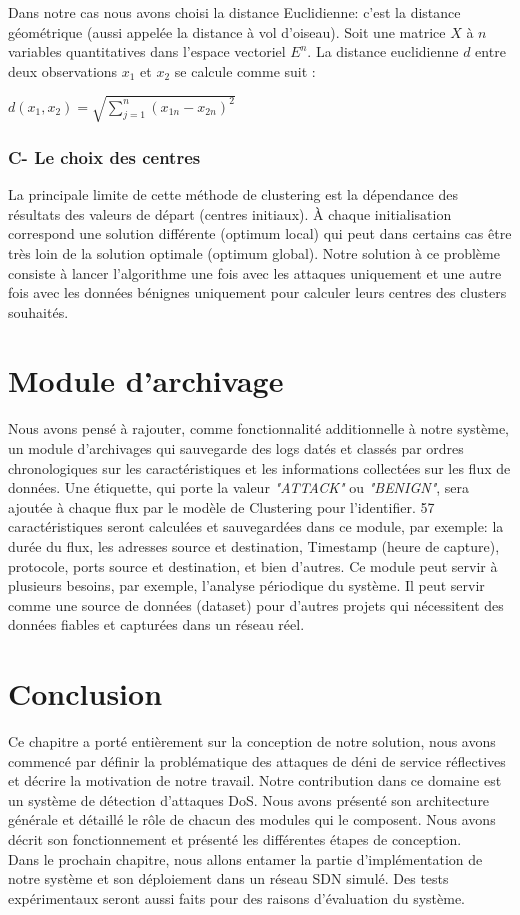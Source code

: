 \noindent Dans notre cas nous avons choisi la distance Euclidienne: c’est la distance géométrique (aussi appelée la distance à vol d’oiseau). Soit une matrice $X$ à $n$ variables quantitatives dans l’espace vectoriel $E^{n}$. La distance euclidienne $d$ entre deux observations $x_{1}$ et $x_{2}$ se calcule comme suit :

\begin{large}
		\begin{center}
			$ d(x_{1}, x_{2}) = \sqrt{\sum_{j=1}^{n}(x_{1n} - x_{2n})^{2}}$
		\end{center}
	\end{large}

\subsubsection{C- Le choix des centres}
La principale limite de cette méthode de clustering est la dépendance des résultats des valeurs de départ (centres initiaux). À chaque initialisation correspond une solution différente (optimum local) qui peut dans certains cas être très loin de la solution optimale (optimum global). Notre solution à ce problème consiste à lancer l'algorithme une fois avec les attaques uniquement et une autre fois avec les données bénignes uniquement pour calculer leurs centres des clusters souhaités.

\section{Module d'archivage}
Nous avons pensé à rajouter, comme fonctionnalité additionnelle à notre système, un module d’archivages qui sauvegarde des logs datés et classés par ordres chronologiques sur les caractéristiques et les informations collectées sur les flux de données.  Une étiquette, qui porte la valeur \textit{"ATTACK"} ou \textit{"BENIGN"}, sera ajoutée à chaque flux par le modèle de Clustering pour l'identifier. 57 caractéristiques seront calculées et sauvegardées dans ce module, par exemple: la durée du flux, les adresses source et destination, Timestamp (heure de capture), protocole, ports source et destination, et bien d'autres. Ce module peut servir à plusieurs besoins, par exemple, l'analyse périodique du système. Il peut servir comme une source de données (dataset) pour d'autres projets qui nécessitent des données fiables et capturées dans un réseau réel. 

\section{Conclusion}
Ce chapitre a porté entièrement sur la conception de notre solution, nous avons commencé par définir la problématique des attaques de déni de service réflectives et décrire la motivation de notre travail. Notre contribution dans ce domaine est un système de détection d'attaques DoS. Nous avons présenté son architecture générale et détaillé le rôle de chacun des modules qui le composent. Nous avons décrit son fonctionnement et présenté les différentes étapes de conception.\\

\noindent Dans le prochain chapitre, nous allons entamer la partie d'implémentation de notre système et son déploiement dans un réseau SDN simulé. Des tests expérimentaux seront aussi faits pour des raisons d'évaluation du système.
